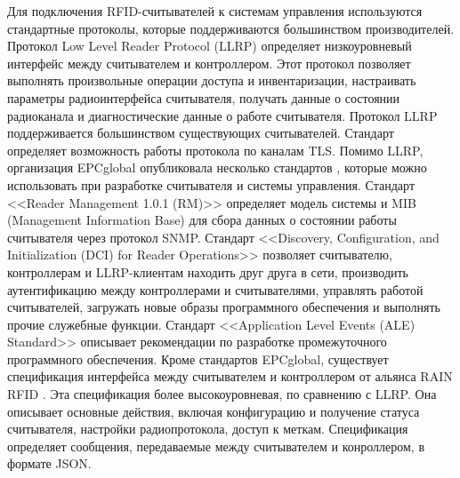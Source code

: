 Для подключения RFID-считывателей к системам управления используются стандартные протоколы, которые поддерживаются большинством производителей. Протокол Low Level Reader Protocol (LLRP) \cite{StdLlrp} определяет низкоуровневый интерфейс между считывателем и контроллером. Этот протокол позволяет выполнять произвольные операции доступа и инвентаризации, настраивать параметры радиоинтерфейса считывателя, получать данные о состоянии радиоканала и диагностические данные о работе считывателя. Протокол LLRP поддерживается большинством существующих считывателей. Стандарт определяет возможность работы протокола по каналам TLS. Помимо LLRP, организация EPCglobal опубликовала несколько стандартов \cite{StdRm, StdDci, StdAle1, StdAle2}, которые можно использовать при разработке считывателя и системы управления. Стандарт <<Reader Management 1.0.1 (RM)>> \cite{StdRm} определяет модель системы и MIB (Management Information Base) для сбора данных о состоянии работы считывателя через протокол SNMP. Стандарт <<Discovery, Configuration, and Initialization (DCI) for Reader Operations>> \cite{StdDci} позволяет считывателю, контроллерам и LLRP-клиентам находить друг друга в сети, производить аутентификацию между контроллерами и считывателями, управлять работой считывателей, загружать новые образы программного обеспечения и выполнять прочие служебные функции. Стандарт <<Application Level Events (ALE) Standard>> \cite{StdAle1, StdAle2} описывает рекомендации по разработке промежуточного программного обеспечения. Кроме стандартов EPCglobal, существует спецификация интерфейса между считывателем и контроллером от альянса RAIN RFID \cite{StdRainRci}. Эта спецификация более высокоуровневая, по сравнению с LLRP. Она описывает основные действия, включая конфигурацию и получение статуса считывателя, настройки радиопротокола, доступ к меткам. Спецификация определяет сообщения, передаваемые между считывателем и конроллером, в формате JSON.

